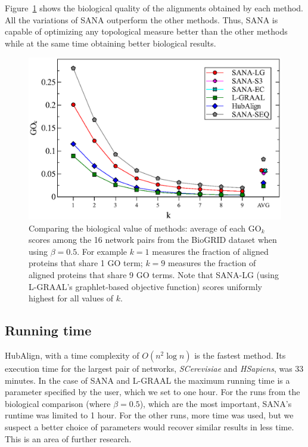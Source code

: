 \documentclass{bioinfo}
\begin{document}
Figure~\ref{fig:biogridgo} shows the biological quality of the alignments obtained by each method. All the variations of SANA outperform the other methods. Thus, SANA is capable of optimizing any topological measure better than the other methods while at the same time obtaining better biological results.

\begin{figure}
\centering
\includegraphics[width=0.99\linewidth]{biogridBeta05go.eps}
\caption{Comparing the biological value of methods: average of each $\mbox{GO}_k$ scores among the 16 network pairs from the BioGRID dataset when using $\beta=0.5$. For example $k=1$ measures the fraction of aligned proteins that share 1 GO term; $k=9$ measures the fraction of aligned proteins that share 9 GO terms. Note that SANA-LG (using L-GRAAL's graphlet-based objective function) scores uniformly highest for all values of $k$.}
\label{fig:biogridgo}
\end{figure}

\subsection{Running time}

HubAlign, with a time complexity of $O(n^2\log n)$ is the fastest method. Its execution time for the largest pair of networks, \textit{SCerevisiae} and \textit{HSapiens}, was 33 minutes. In the case of SANA and L-GRAAL the maximum running time is a parameter specified by the user, which we set to one hour. For the runs from the biological comparison (where $\beta=0.5$), which are the most important, SANA's runtime was limited to 1 hour. For the other runs, more time was used, but we suspect a better choice of parameters would recover similar results in less time. This is an area of further research.
\end{document}
